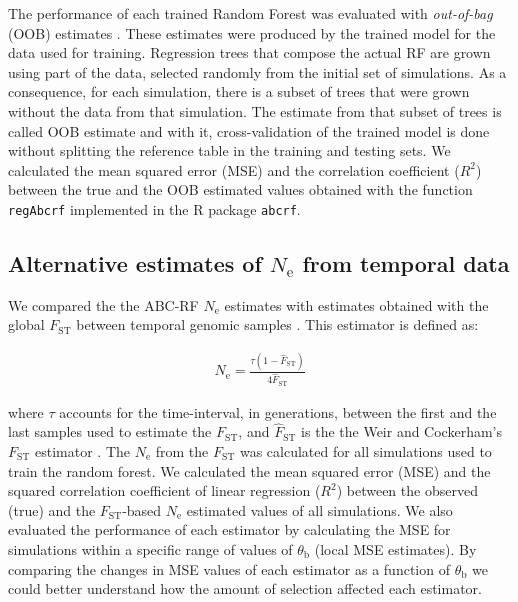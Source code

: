 \documentclass[a4paper, 12pt]{article}
\begin{document}
The performance of each trained Random Forest was evaluated with \textit{out-of-bag} (OOB) estimates \citep{Breiman:2001fb}. These estimates were produced by the trained model for the data used for training. Regression trees that compose the actual RF are grown using part of the data, selected randomly from the initial set of simulations. As a consequence, for each simulation, there is a subset of trees that were grown without the data from that simulation. The estimate from that subset of trees is called OOB estimate and with it, cross-validation of the trained model is done without splitting the reference table in the training and testing sets. We calculated the mean squared error (MSE) and the correlation coefficient ($R^2$) between the true and the OOB estimated values obtained with the function \texttt{regAbcrf} implemented in the R package \texttt{abcrf}.

\subsection*{Alternative estimates of $N_\mathrm{e}$ from temporal data}

We compared the the ABC-RF $N_\mathrm{e}$ estimates with estimates obtained with the global $F_\mathrm{ST}$ between temporal genomic samples \citep{Frachon:2017fw}. This estimator is defined as:

\begin{gather*}
\hat N_\mathrm{e} = \frac{\tau(1-\hat F_\mathrm{ST})}{4\hat F_\mathrm{ST} } 
\end{gather*}

\noindent where $\tau$ accounts for the time-interval, in generations, between the first and the last samples used to estimate the $F_\mathrm{ST}$, and $\hat F_\mathrm{ST}$ is the the Weir and Cockerham's $F_\mathrm{ST}$ estimator \citep{Weir:1984dx}. The $N_\mathrm{e}$ from the $F_\mathrm{ST}$ was calculated for all simulations used to train the random forest. We calculated the mean squared error (MSE) and the squared correlation coefficient of linear regression ($R^2$) between the observed (true) and the $F_\mathrm{ST}$-based $N_\mathrm{e}$ estimated values of all simulations. We also evaluated the performance of each estimator by calculating the MSE for simulations within a specific range of values of $\theta_\mathrm{b}$ (local MSE estimates). By comparing the changes in MSE values of each estimator as a function of $\theta_\mathrm{b}$ we could better understand how the amount of selection affected each estimator.
\end{document}
